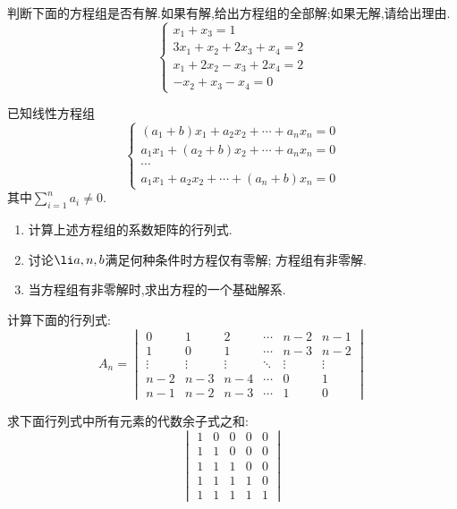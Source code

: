 \documentclass{ctexart}
\begin{document}
\pagestyle{empty}
\begin{center}
\end{center}
\begin{homework}[1(10')]
    判断下面的方程组是否有解.如果有解,给出方程组的全部解;如果无解,请给出理由.
    \[\left\{\begin{array}{l}
        x_1+x_3=1\\
        3x_1+x_2+2x_3+x_4=2\\
        x_1+2x_2-x_3+2x_4=2\\
        -x_2+x_3-x_4=0
    \end{array}\right.\]
\end{homework}
\begin{homework}[2(10')]
    已知线性方程组
    \[\left\{\begin{array}{c}
        \left(a_1+b\right)x_1+a_2x_2+\cdots+a_nx_n=0\\
        a_1x_1+\left(a_2+b\right)x_2+\cdots+a_nx_n=0\\
        \cdots\\
        a_1x_1+a_2x_2+\cdots+\left(a_n+b\right)x_n=0
    \end{array}\right.\]
    其中$\displaystyle\sum_{i=1}^{n}a_i\neq0$.
    \begin{enumerate}[label=\tbf{(\arabic*)},topsep=0pt,parsep=0pt,itemsep=0pt,partopsep=0pt]
        \item 计算上述方程组的系数矩阵的行列式.
        \item 讨论$\li a,n,b$满足何种条件时方程仅有零解; 方程组有非零解.
        \item 当方程组有非零解时,求出方程的一个基础解系.
    \end{enumerate}
\end{homework}
\begin{homework}[3(15')]
    计算下面的行列式:
    \[A_n=\begin{vmatrix}
        0&1&2&\cdots&n-2&n-1\\
        1&0&1&\cdots&n-3&n-2\\
        \vdots&\vdots&\vdots&\ddots&\vdots&\vdots\\
        n-2&n-3&n-4&\cdots&0&1\\
        n-1&n-2&n-3&\cdots&1&0
    \end{vmatrix}\]
\end{homework}
\begin{homework}[4(13')]
    求下面行列式中所有元素的代数余子式之和:
    \[\begin{vmatrix}
        1&0&0&0&0\\
        1&1&0&0&0\\
        1&1&1&0&0\\
        1&1&1&1&0\\
        1&1&1&1&1
    \end{vmatrix}\]
\end{homework}
\end{document}
